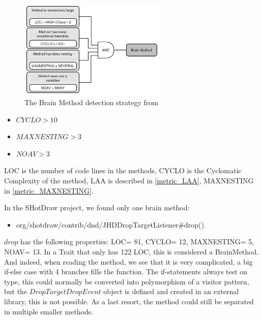 \documentclass[onecolumn]{article}
\begin{document}
\begin{figure}[H]
    \centering
    \includegraphics[width=200pt]{fig/lanza_BrainMethod.PNG}
    \caption{The Brain Method detection strategy from \protect\cite{lanza2007object}}
    \label{fig:lanza_BrainMethod}
\end{figure}

\begin{itemize}
    \item $CYCLO > 10$
    \item $MAXNESTING > 3$
    \item $NOAV > 3$
\end{itemize}
LOC is the number of code lines in the methods, CYCLO is the Cyclomatic Complexity of the method, LAA is described in \ref{metric_LAA}, MAXNESTING in \ref{metric_MAXNESTING}.

In the SHotDraw project, we found only one brain method:
\begin{itemize}
    \item org/shotdraw/contrib/dnd/JHDDropTargetListener\#drop().
\end{itemize}

$drop$ has the following properties: LOC= 81, CYCLO= 12, MAXNESTING= 5, NOAV= 13. In a Trait that only has 122 LOC, this is considered a BrainMethod. And indeed, when reading the method, we see that it is very complicated, a big if-else case with 4 branches fills the function. The if-statements always test on type, this could normally be converted into polymorphism of a visitor pattern, but the $DropTargetDropEvent$ object is defined and created in an external library, this is not possible. As a last resort, the method could still be separated in multiple smaller methods.
\end{document}
